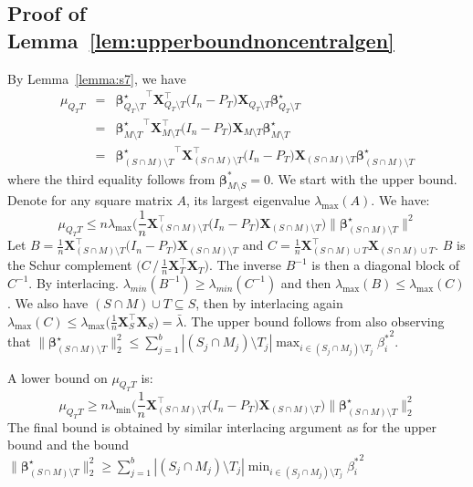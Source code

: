 \documentclass[aos]{imsart}
\theoremstyle{plain}
\newcommand{\bs}{\boldsymbol}
\begin{document}
\subsection{Proof of Lemma~\ref{lem:upperboundnoncentralgen}}
By Lemma~\ref{lemma:s7}, we have
\begin{eqnarray*}
    \mu_{Q_TT}&=&{\bs \beta^{\star}_{Q_T\setminus T}}^{\top}\bs X_{Q_T\setminus T}^{\top}  \big(I_n-P_T\big) \bs X_{Q_T\setminus T} \bs \beta^{\star}_{Q_T\setminus T}\\
    &=&{\bs \beta^{\star}_{M\setminus T}}^{\top}\bs X_{M\setminus T}^{\top}  \big(I_n-P_T\big) \bs X_{M\setminus T} \bs \beta^{\star}_{M\setminus T}\\
    &=&{\bs \beta^{\star}_{(S\cap M)\setminus T}}^{\top}\bs X_{(S\cap M)\setminus T}^{\top}  \big(I_n-P_T\big) \bs X_{(S\cap M)\setminus T} \bs \beta^{\star}_{(S\cap M)\setminus T}
\end{eqnarray*}
where the third equality follows from $\bs \beta^*_{M\setminus S}=0$.
We start with the upper bound. Denote for any square matrix $A$, its largest eigenvalue 
$\lambda_{\max}(A)$. We have:
$$\mu_{Q_TT}\leq n\lambda_{\max}\Big(\frac{1}{n}\bs X_{(S\cap M)\setminus T}^{\top}  \big(I_n-P_T\big) \bs X_{(S\cap M)\setminus T}\Big) \|\bs \beta^{\star}_{(S\cap M)\setminus T}\|^2$$
Let $B=\tfrac{1}{n}\bs X_{(S\cap M)\setminus T}^{\top}  \big(I_n-P_T\big) \bs X_{(S\cap M)\setminus T}$ and $C=\tfrac{1}{n}\bs X_{(S\cap M)\cup T}^{\top}\bs X_{(S\cap M)\cup T}$. $B$ is the Schur complement $\big(C \,  / \, \tfrac{1}{n}\bs X_T^{\top} \bs X_T\big)$. The inverse $B^{-1}$ is then a diagonal block of $C^{-1}$. By interlacing. $\lambda_{min}(B^{-1})\geq \lambda_{min}(C^{-1})$ and then $\lambda_{\max}(B)\leq \lambda_{\max}(C)$. We also have $(S\cap M)\cup T \subseteq S$, then by interlacing again $\lambda_{\max}(C)\leq \lambda_{\max}\Big(\tfrac{1}{n}\bs X_S^{\top}\bs X_S\Big)=\bar{\lambda}$. The upper bound follows from also observing that $\|\bs \beta^{\star}_{(S\cap M)\setminus T}\|_2^2\leq \sum_{j=1}^b |(S_j\cap M_j)\setminus T_j|\max_{i\in (S_j\cap M_j)\setminus T_j}{\beta_i^*}^2$.

A lower bound on $\mu_{Q_TT}$ is: 
$$\mu_{Q_TT}\geq n\lambda_{\min}\Big(\frac{1}{n}\bs X_{(S\cap M)\setminus T}^{\top}  \big(I_n-P_T\big) \bs X_{(S\cap M)\setminus T}\Big) \|\bs \beta^{\star}_{(S\cap M)\setminus T}\|_2^2$$
The final bound is obtained by similar interlacing argument as for the upper bound and the bound $\|\bs \beta^{\star}_{(S\cap M)\setminus T}\|_2^2\geq \sum_{j=1}^b |(S_j\cap M_j)\setminus T_j|\min_{i\in (S_j\cap M_j)\setminus T_j}{\beta_i^*}^2$
\end{document}
